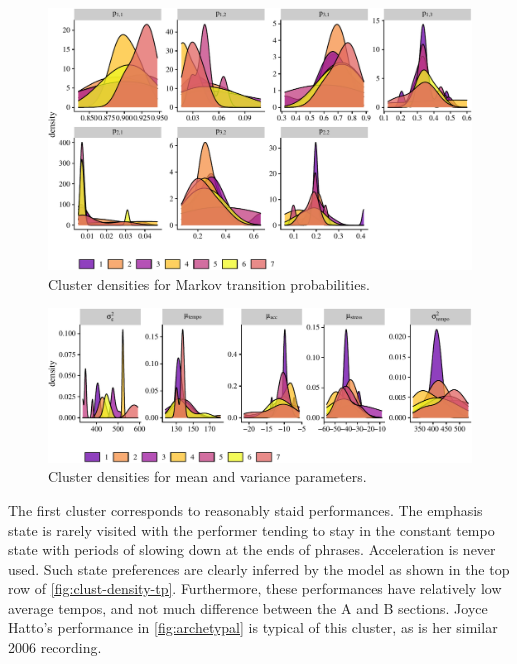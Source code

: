 \documentclass[aoas]{imsart}
\begin{document}
\begin{figure}[t]
  \centering
  \includegraphics[width=.9\linewidth]{clust-densities-sub2-1}
  \caption{Cluster densities for Markov transition probabilities.}
  \label{fig:clust-density-tp}
\end{figure}
\begin{figure}[t]
  \centering
  \includegraphics[width=.9\linewidth]{clust-densities-sub1-1}
  \caption{Cluster densities for mean and variance parameters.}
  \label{fig:clust-density-mv}
\end{figure}
The first cluster corresponds to reasonably staid performances. The emphasis state is rarely visited with the performer tending
to stay in the constant tempo state with periods of slowing down at
the ends of phrases. Acceleration is never used. Such state
preferences are clearly inferred by the model as shown in the
top row of \autoref{fig:clust-density-tp}. Furthermore, these
performances have relatively low average tempos, and not much
difference between the A and B sections. Joyce Hatto's performance
in \autoref{fig:archetypal} is typical of this cluster, as is her
similar 2006 recording.
\end{document}
